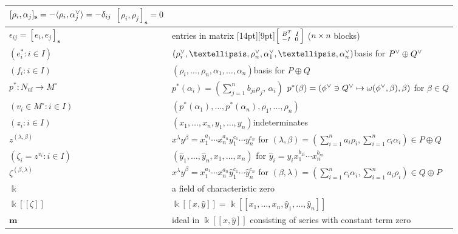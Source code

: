 \documentclass[10pt,a4paper]{amsart}
\theoremstyle{definition}
\DeclareMathOperator{\uf}{uf}
\newcommand\llbracket{[\![}
\newcommand\rrbracket{]\!]}
\newcommand{\br}[1]{{\langle #1 \rangle}}
\newcommand{\ck}{\spcheck}
\newcommand{\s}{\mathbf{s}}
\newcommand{\m}{\mathbf{m}}
\renewcommand{\k}{\Bbbk}
\newcommand{\hy}{\hat{y}}
\begin{document}
{\begin{longtable}{P{88pt}|P{242pt}}
$[\rho_i,\alpha_j]_\s=-\br{\rho_i,\alpha_j\ck}=-\delta_{ij}$ \newline
$[\rho_i,\rho_j]_\s=0$
\\\hline
$\epsilon_{ij}=[e_i,e_j]_\s$&entries in matrix \raisebox{0pt}[14pt][9pt]{$\begin{bsmallmatrix}\,B^T&\,I\\-I&0\end{bsmallmatrix}$} ($n\times n$ blocks)\\\hline
$(e^*_i:i\in I)$&$(\rho_i\ck,\ldots,\rho_n\ck,\alpha_1\ck,\ldots,\alpha_n\ck)$\quad basis for $P\ck\oplus Q\ck$\\\hline
$(f_i:i\in I)$&$(\rho_i,\ldots,\rho_n,\alpha_1,\ldots,\alpha_n)$\quad basis for $P\oplus Q$\\\hline
$p^*:N_{\uf}\to M^\circ$&$p^*(\alpha_i)=(\sum_{j=1}^nb_{ji}\rho_j,\,\alpha_i)$ %
\newline
$p^*(\beta)=(\phi\ck\ni Q\ck\mapsto\omega(\phi\ck,\beta),\beta)$ for $\beta\in Q$
\\\hline
$(v_i\in M^\circ:i\in I)$&$(p^*(\alpha_1),\ldots,p^*(\alpha_n),\rho_1,\ldots,\rho_n)$\\\hline
$(z_i:i\in I)$&$(x_1,\ldots,x_n,y_1,\ldots,y_n)$\quad indeterminates\\\hline
$z^{(\lambda,\beta)}$&$x^\lambda y^\beta=x_1^{a_1}\cdots x_n^{a_n}y_1^{c_1}\cdots y_n^{c_n}$ for $(\lambda,\beta)=(\sum_{i=1}^na_i\rho_i,\sum_{i=1}^nc_i\alpha_i)\in P\oplus Q$\\\hline
$(\zeta_i=z^{v_i}:i\in I)$&$(\hy_1,\ldots,\hy_n,x_1,\ldots,x_n)$ for $\hy_i=y_ix_1^{b_{1i}}\cdots x_n^{b_{ni}}$\\\hline
$\zeta^{(\beta,\lambda)}$&
$x^\lambda \hy^\beta=x_1^{a_1}\cdots x_n^{a_n}\hy_1^{c_1}\cdots\hy_n^{c_n}$ for $(\beta,\lambda)=(\sum_{i=1}^nc_i\alpha_i,\sum_{i=1}^na_i\rho_i)\in Q\oplus P$\\\hline
$\k$&a field of characteristic zero\\\hline
$\k\llbracket \zeta\rrbracket $&$\k\llbracket x,\hy\rrbracket =\k\llbracket x_1,\ldots,x_n,\hy_1,\ldots,\hy_n\rrbracket $\\\hline
$\m$&ideal in $\k\llbracket x,\hy\rrbracket $ consisting of series with constant term zero\\\hline
\end{longtable}}%
\end{document}
